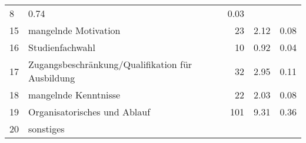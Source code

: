 \begin{longtable}{lXrrr}
       \num{8} &
       \num[round-mode=places,round-precision=2]{0,74} &
         \num[round-mode=places,round-precision=2]{0,03} \\

     15 &
     \multicolumn{1}{X}{ mangelnde Motivation   } &


       \num{23} &
       \num[round-mode=places,round-precision=2]{2,12} &
         \num[round-mode=places,round-precision=2]{0,08} \\

     16 &
     \multicolumn{1}{X}{ Studienfachwahl   } &


       \num{10} &
       \num[round-mode=places,round-precision=2]{0,92} &
         \num[round-mode=places,round-precision=2]{0,04} \\

     17 &
     \multicolumn{1}{X}{ Zugangsbeschränkung/Qualifikation für Ausbildung   } &


       \num{32} &
       \num[round-mode=places,round-precision=2]{2,95} &
         \num[round-mode=places,round-precision=2]{0,11} \\

     18 &
     \multicolumn{1}{X}{ mangelnde Kenntnisse   } &


       \num{22} &
       \num[round-mode=places,round-precision=2]{2,03} &
         \num[round-mode=places,round-precision=2]{0,08} \\

     19 &
     \multicolumn{1}{X}{ Organisatorisches und Ablauf   } &


       \num{101} &
       \num[round-mode=places,round-precision=2]{9,31} &
         \num[round-mode=places,round-precision=2]{0,36} \\

     20 &
     \multicolumn{1}{X}{ sonstiges   } &



\end{longtable}
